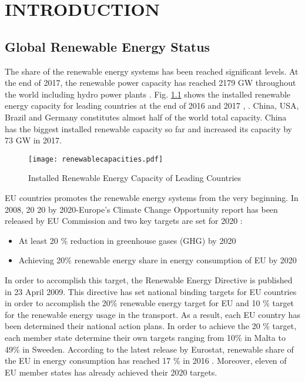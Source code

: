 \chapter{INTRODUCTION}
\label{chp:1}
\section{Global Renewable Energy Status}
The share of the renewable energy systems has been reached significant levels. At the end of 2017, the renewable power capacity has reached 2179 GW throughout the world including hydro power plants \cite{InternationalRenewableEnergyAgencyIRENA2018}. Fig. \ref{renewablecap} shows the installed renewable energy capacity for leading countries at the end of 2016 and 2017 \cite{InternationalRenewableEnergyAgency2017}, \cite{InternationalRenewableEnergyAgencyIRENA2018}. China, USA, Brazil and Germany constitutes almost half of the world total capacity. China has the biggest installed renewable capacity so far and increased its capacity by 73 GW in 2017.\par
\begin{figure}[h]
	\centering
	\texttt{[image: renewablecapacities.pdf]}
	\caption{Installed Renewable Energy Capacity of Leading Countries}
	\label{renewablecap}
\end{figure}
EU countries promotes the renewable energy systems from the very beginning. In 2008, 20 20 by 2020-Europe's Climate Change Opportunity report has been released by EU Commission and two key targets are set for 2020 \cite{EuropeanCommission2008}: 
\begin{itemize}  
	\item At least 20 \% reduction in greenhouse gases (GHG) by 2020
	\item Achieving 20\% renewable energy share in energy consumption of EU by 2020
\end{itemize}
In order to accomplish this target, the Renewable Energy Directive is published in 23 April 2009. This directive has set national binding targets for EU countries in order to accomplish the 20\% renewable energy target for EU and 10 \% target for the renewable energy usage in the transport. \cite{EuropeanParliament2009} As a result, each EU country has been determined their national action plans. In order to achieve the 20 \% target, each member state determine their own targets ranging from 10\% in Malta to 49\% in Sweeden. According to the latest release by Eurostat, renewable share of the EU in energy consumption has reached 17 \% in 2016 \cite{States2016}. Moreover, eleven of EU member states has already achieved their 2020 targets.\par
